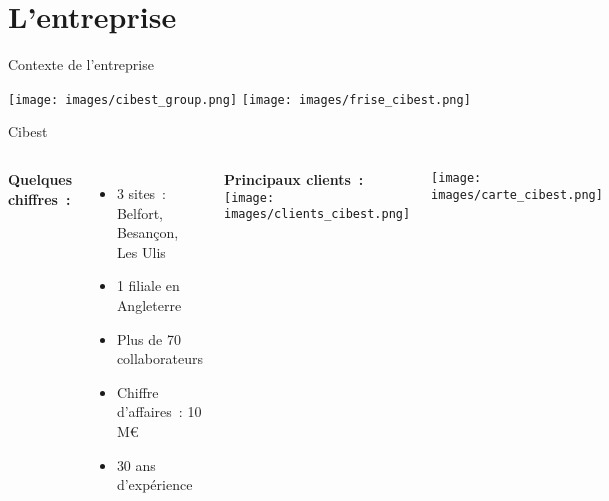 
\section{L'entreprise}

\begin{frame}{Contexte de l'entreprise}
    
    \begin{center}
        \vspace*{-0.2cm}
        \texttt{[image: images/cibest\_group.png]}
        \hspace*{-0.5cm}
        \texttt{[image: images/frise\_cibest.png]}
    \end{center}
  
\end{frame}

\begin{frame}{Cibest}
    \begin{columns}
        
\textbf{Quelques chiffres~:}
\begin{itemize}
    \item 3 sites~: Belfort, Besançon, Les Ulis
    \item 1 filiale en Angleterre
    \item Plus de 70 collaborateurs
    \item Chiffre d'affaires~: 10 M\euro{}
    \item 30 ans d'expérience
\end{itemize}
\vspace{0.6cm}
\textbf{Principaux clients~:\\[0.3cm]}
\hspace*{-0.7cm}
\texttt{[image: images/clients\_cibest.png]}

        \texttt{[image: images/carte\_cibest.png]}
        
    \end{columns}
\end{frame}


